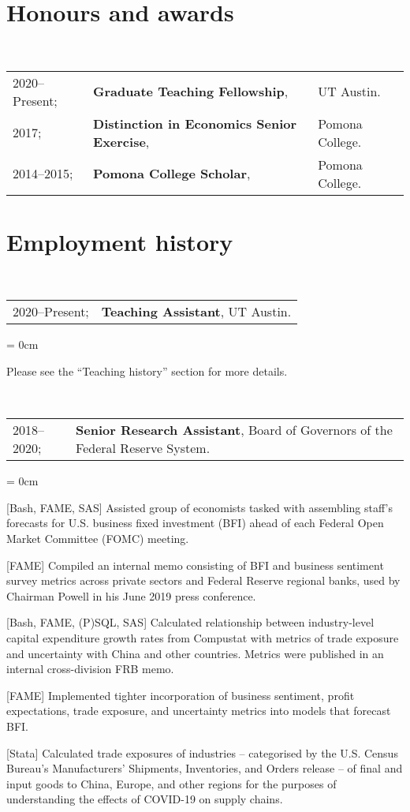 \documentclass[a4paper, 10pt]{article}
\begin{document}
  \section{Honours and awards}
  ~\begin{tabular}{lll}
    2020--Present; & \textbf{Graduate Teaching Fellowship}, & UT Austin.\\
    2017; & \textbf{Distinction in Economics Senior Exercise}, & Pomona College.\\
    2014--2015; & \textbf{Pomona College Scholar}, & Pomona College.
  \end{tabular}
  \vspace*{0.25em}

  \section{Employment history}
  ~\begin{tabular}{ll}
    2020--Present; & \textbf{Teaching Assistant}, UT Austin.
  \end{tabular}
  \begin{compactitem}\parskip = 0cm
    \item Please see the ``Teaching history'' section for more details.
  \end{compactitem}
  \vspace*{1.25em}

  ~\begin{tabular}{ll}
    2018--2020; & \textbf{Senior Research Assistant}, Board of Governors of the Federal Reserve System.
  \end{tabular}
  \begin{compactitem}\parskip = 0cm
    \item {[Bash, FAME, SAS]} Assisted group of economists tasked with assembling staff's forecasts for U.S. business fixed investment (BFI) ahead of each Federal Open Market Committee (FOMC) meeting.
    \item {[FAME]} Compiled an internal memo consisting of BFI and business sentiment survey metrics across private sectors and Federal Reserve regional banks, used by Chairman Powell in his June 2019 press conference.
    \item {[Bash, FAME, (P)SQL, SAS]} Calculated relationship between industry-level capital expenditure growth rates from Compustat with metrics of trade exposure and uncertainty with China and other countries. Metrics were published in an internal cross-division FRB memo.
    \item {[FAME]} Implemented tighter incorporation of business sentiment, profit expectations, trade exposure, and uncertainty metrics into models that forecast BFI.
    \item {[Stata]} Calculated trade exposures of industries -- categorised by the U.S. Census Bureau's Manufacturers' Shipments, Inventories, and Orders release -- of final and input goods to China, Europe, and other regions for the purposes of understanding the effects of COVID-19 on supply chains.
  \end{compactitem}
  \vspace*{1.25em}
      
\end{document}
